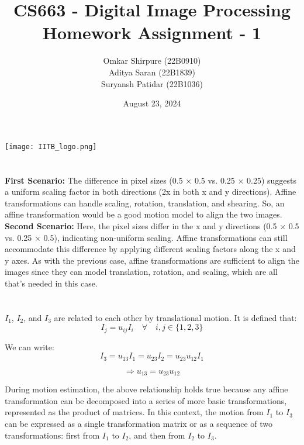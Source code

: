 \documentclass[a4paper, 11pt]{article}
\title{
    \vspace*{1cm} %
    \Huge CS663 - Digital Image Processing \\ %
    \vspace{2cm} %
    \LARGE Homework Assignment - 1 \\
    \vspace{0.2cm}
    \vspace{3cm}
}
\author{
    Omkar Shirpure (22B0910) \\
    Aditya Saran (22B1839)\\
    Suryansh Patidar (22B1036) \\
}
\date{\vspace{3cm}August 23, 2024}
\begin{document}
\maketitle

\vfill
\begin{center}
    \texttt{[image: IITB\_logo.png]} %
\end{center}

\thispagestyle{empty} %

\newpage

\setcounter{page}{1} %

\section{}
    \textbf{First Scenario:}  
    The difference in pixel sizes (0.5 × 0.5 vs. 0.25 × 0.25) suggests a uniform scaling factor in both directions (2x in both x and y directions). Affine transformations can handle scaling, rotation, translation, and shearing. So, an affine transformation would be a good motion model to align the two images.\\
    
\noindent
    \textbf{Second Scenario:}  
    Here, the pixel sizes differ in the x and y directions (0.5 × 0.5 vs. 0.25 × 0.5), indicating non-uniform scaling. Affine transformations can still accommodate this difference by applying different scaling factors along the x and y axes. As with the previous case, affine transformations are sufficient to align the images since they can model translation, rotation, and scaling, which are all that’s needed in this case.

\vspace{1cm}
\section{}
$I_1$, $I_2$, and $I_3$ are related to each other by translational motion. It is defined that:
\[
    I_j = u_{ij} I_i \quad \forall \quad i,j \in \{1,2,3\}
\]

We can write:
\[
    I_3 = u_{13} I_1 = u_{23} I_2 = u_{23} u_{12} I_1
\]

\[
    \Rightarrow u_{13} = u_{23} u_{12}
\]

During motion estimation, the above relationship holds true because any affine transformation can be decomposed into a series of more basic transformations, represented as the product of matrices. In this context, the motion from $I_1$ to $I_3$ can be expressed as a single transformation matrix or as a sequence of two transformations: first from $I_1$ to $I_2$, and then from $I_2$ to $I_3$.
\end{document}
